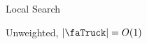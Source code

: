 \begin{frame}
\vfill
\begin{center}
\Huge 
Local Search

\huge
Unweighted, $|\text{\faTruck}| = O(1)$
\end{center}
\vfill
\end{frame}